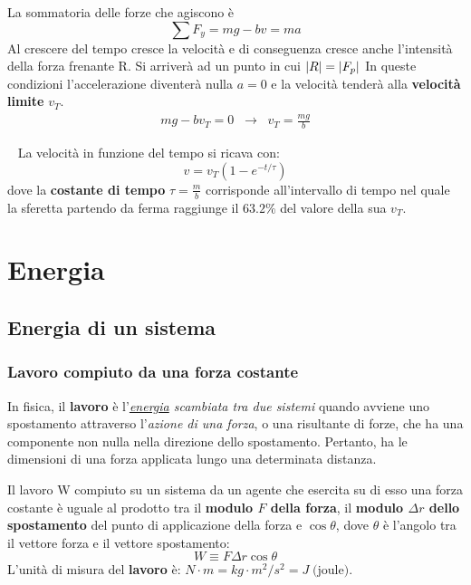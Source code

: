 \documentclass[a4paper,11pt,oneside]{book}
\begin{document}
\noindent La sommatoria delle forze che agiscono è 
\begin{equation*}
    \sum F_y = mg - bv = ma
\end{equation*}
Al crescere del tempo cresce la velocità e di conseguenza cresce anche l'intensità della forza frenante R. Si arriverà ad un punto in cui $\abs{R} = \abs{F_p}$
In queste condizioni l'accelerazione diventerà nulla $a=0$ e la velocità tenderà alla \textbf{velocità limite} $v_T$.
\begin{align*}
    mg - bv_T = 0 \;\; \rightarrow \;\; v_T = \frac{mg}{b}
\end{align*}

~\newline
La velocità in funzione del tempo si ricava con:
\begin{equation*}
    v = v_T(1-e^{-t/\tau})
\end{equation*}
dove la \textbf{costante di tempo} $\tau = \tfrac{m}{b}$ corrisponde all’intervallo di tempo nel quale la sferetta partendo da ferma raggiunge il $63.2\%$ del valore della sua $v_T$.

\chapter{Energia}

\section{Energia di un sistema}
\subsection{Lavoro compiuto da una forza costante}
In fisica, il \textbf{lavoro} è l'\emph{\underline{energia} scambiata tra due sistemi} quando avviene uno spostamento attraverso l'\emph{azione di una forza}, o una risultante di forze, che ha una componente non nulla nella direzione dello spostamento. 
Pertanto, ha le dimensioni di una forza applicata lungo una determinata distanza. 

Il lavoro W compiuto su un sistema da un agente che esercita su di esso una forza costante è uguale al prodotto tra il \textbf{modulo $F$ della forza}, 
il \textbf{modulo $\Delta r$ dello spostamento} del punto di applicazione della forza e {\boldmath$\cos{\theta}$}, dove $\theta$ è l’angolo tra il vettore forza e il vettore spostamento:
\begin{equation*}
    W \equiv F \Delta r \cos{\theta}
\end{equation*}
L'unità di misura del \textbf{lavoro} è: $N \cdot m = kg \cdot m^2/s^2 = J \; \text{(joule)}$.
\end{document}
